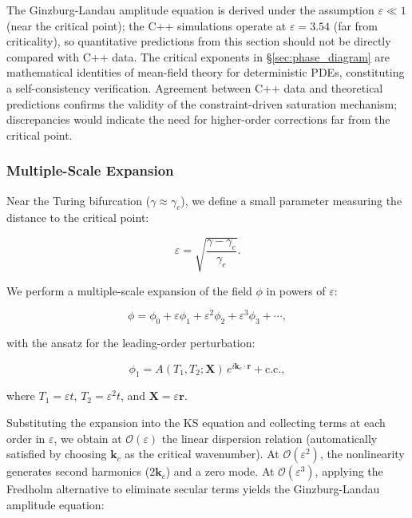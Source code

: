 \documentclass[sn-nature,pdflatex]{sn-jnl}
\begin{document}
The Ginzburg-Landau amplitude equation is derived under the assumption $\varepsilon \ll 1$ (near the critical point); the C++ simulations operate at $\varepsilon = 3.54$ (far from criticality), so quantitative predictions from this section should not be directly compared with C++ data. The critical exponents in \S\ref{sec:phase_diagram} are mathematical identities of mean-field theory for deterministic PDEs, constituting a self-consistency verification. Agreement between C++ data and theoretical predictions confirms the validity of the constraint-driven saturation mechanism; discrepancies would indicate the need for higher-order corrections far from the critical point.

\subsubsection{Multiple-Scale Expansion}

Near the Turing bifurcation ($\gamma \approx \gamma_c$), we define a small parameter measuring the distance to the critical point:

\begin{equation}
\varepsilon = \sqrt{\frac{\gamma - \gamma_c}{\gamma_c}}.
\end{equation}

We perform a multiple-scale expansion of the field $\phi$ in powers of $\varepsilon$:

\begin{equation}
\phi = \phi_0 + \varepsilon \phi_1 + \varepsilon^2 \phi_2 + \varepsilon^3 \phi_3 + \cdots,
\end{equation}

with the ansatz for the leading-order perturbation:

\begin{equation}
\phi_1 = A(T_1, T_2; \mathbf{X}) \, e^{i\mathbf{k}_c \cdot \mathbf{r}} + \text{c.c.},
\end{equation}

where $T_1 = \varepsilon t$, $T_2 = \varepsilon^2 t$, and $\mathbf{X} = \varepsilon \mathbf{r}$.

Substituting the expansion into the KS equation and collecting terms at each order in $\varepsilon$, we obtain at $\mathcal{O}(\varepsilon)$ the linear dispersion relation (automatically satisfied by choosing $\mathbf{k}_c$ as the critical wavenumber). At $\mathcal{O}(\varepsilon^2)$, the nonlinearity generates second harmonics ($2\mathbf{k}_c$) and a zero mode. At $\mathcal{O}(\varepsilon^3)$, applying the Fredholm alternative to eliminate secular terms yields the Ginzburg-Landau amplitude equation:
\end{document}
